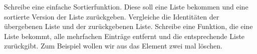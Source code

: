 \begin{aufg}
  Schreibe eine einfache Sortierfunktion. Diese soll eine Liste bekommen und eine sortierte Version der Liste zurückgeben.
  Vergleiche die Identitäten der übergebenen Liste und der zurückgebenen Liste.
  Schreibe eine Funktion, die eine Liste bekommt, alle mehrfachen Einträge
  entfernt und die entsprechende Liste zurückgibt. Zum Beispiel wollen wir aus
  \lpy{[2,2,3,2]} das Element  zwei mal löschen.
\end{aufg}
